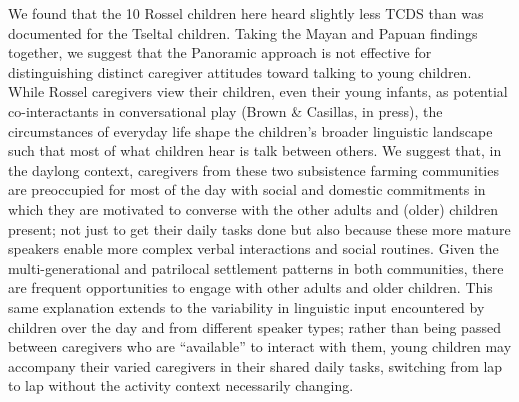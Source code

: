 \documentclass[,man,floatsintext]{apa6}
\begin{document}
We found that the 10 Rossel children here heard slightly less TCDS than
was documented for the Tseltal children. Taking the Mayan and Papuan
findings together, we suggest that the Panoramic approach is not
effective for distinguishing distinct caregiver attitudes toward talking
to young children. While Rossel caregivers view their children, even
their young infants, as potential co-interactants in conversational play
(Brown \& Casillas, in press), the circumstances of everyday life shape
the children's broader linguistic landscape such that most of what
children hear is talk between others. We suggest that, in the daylong
context, caregivers from these two subsistence farming communities are
preoccupied for most of the day with social and domestic commitments in
which they are motivated to converse with the other adults and (older)
children present; not just to get their daily tasks done but also
because these more mature speakers enable more complex verbal
interactions and social routines. Given the multi-generational and
patrilocal settlement patterns in both communities, there are frequent
opportunities to engage with other adults and older children. This same
explanation extends to the variability in linguistic input encountered
by children over the day and from different speaker types; rather than
being passed between caregivers who are \enquote{available} to interact
with them, young children may accompany their varied caregivers in their
shared daily tasks, switching from lap to lap without the activity
context necessarily changing.
\end{document}
